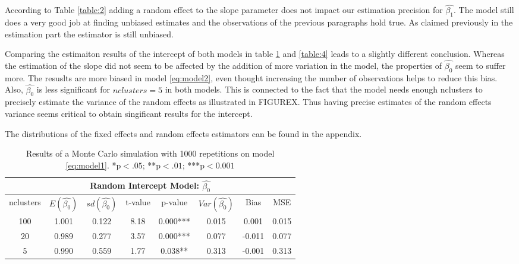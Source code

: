 \documentclass[a4paper,11pt]{article}
\begin{document}
	According to Table \ref{table:2} adding a random effect to the slope parameter does not impact our estimation precision for $\hat{\beta_1}$. The model still does a very good job at finding unbiased estimates and the observations of the previous paragraphs hold true. As claimed previously in the estimation part the estimator is still unbiased.
	
	Comparing the estimaiton results of the intercept of both models in table \ref{table:3} and \ref{table:4} leads to a slightly different conclusion. Whereas the estimation of the slope did  not seem to be affected by the addition of more variation in the model, the properties of $\hat{\beta_0}$ seem to suffer more. The resuslts are more biased in model \ref{eq:model2}, even thought increasing the number of observations helps to reduce this bias. 
	Also, $\hat{\beta_0}$ is less significant for $nclusters=5$ in both models. This is connected to the fact that the model needs enough nclusters to precisely estimate the variance of the random effects as illustrated in FIGUREX. Thus having precise estimates of the random effects variance seems critical to obtain singificant results for the intercept.
	 
	The distributions of the fixed effects and random effects estimators can be found in the appendix.
		\begin{table}[h!]
		\centering
		\begin{tabular}{||c c c c c c c c||} 
			\hline
			\multicolumn{8}{|c|}{Random Intercept Model: $\hat{\beta_0}$} \\
			
			\hline
			nclusters & $E(\hat{\beta_0})$ & $sd(\hat{\beta_0})$& t-value & p-value &$Var(\hat{\beta_0})$ & Bias & MSE \\ [0.5ex] 
			\hline
			100 & 1.001 & 0.122&8.18 &0.000***	&0.015 &0.001 &   0.015 \\ 
			20 & 0.989 &	0.277&3.57 &0.000*** &0.077 &-0.011 &  0.077  \\ 	
			5 & 	0.990&  0.559& 1.77&0.038**  &0.313 &-0.001 &   0.313 \\ 
			[1ex] 
			\hline
		\end{tabular}
		\caption{Results of a Monte Carlo simulation with 1000 repetitions on model \ref{eq:model1}. *p$<.05$; **p$<.01$; ***p$<0.001$}
				\label{table:3}
	\end{table}
\end{document}
